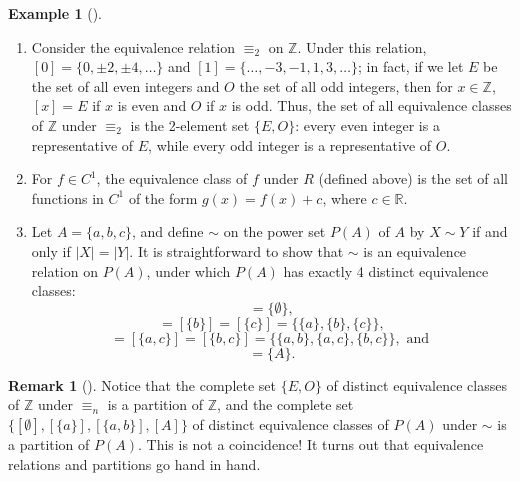 \documentclass[10pt,]{book}
\theoremstyle{plain}
\theoremstyle{definition}
\theoremstyle{definition}
\newtheorem{remark}[theorem]{Remark}
\theoremstyle{definition}
\newtheorem{example}[theorem]{Example}
\theoremstyle{definition}
\numberwithin{equation}{section}
\def\Z{\mathbb{Z}}
\def\R{\mathbb{R}}
\begin{document}
\begin{example}[]\label{example-66}
\leavevmode%
\begin{enumerate}
\item\hypertarget{li-405}{}Consider the equivalence relation \(\equiv_2\) on \(\Z\).  Under this relation, \([0]=\{0,\pm 2, \pm 4, \ldots\}\) and \([1]=\{\ldots, -3, -1, 1, 3, \ldots\}\); in fact, if we let \(E\) be the set of all even integers and \(O\) the set of all odd integers, then for \(x\in \Z\), \([x]=E\) if \(x\) is even and \(O\) if \(x\) is odd. Thus, the set of all equivalence classes of \(\Z\) under \(\equiv_2\) is the 2-element set \(\{E,O\}\): every even integer is a representative of \(E\), while every odd integer is a representative of \(O\).%
\item\hypertarget{li-406}{}For \(f\in C^1\), the equivalence class of \(f\) under \(R\) (defined above) is the set of all functions in \(C^1\) of the form \(g(x)=f(x)+c\), where \(c\in \R\).%
\item\hypertarget{li-407}{}Let \(A=\{a,b,c\}\), and define \(\sim\) on the power set \(P(A)\) of \(A\) by \(X\sim Y\) if and only if \(|X|=|Y|\). It is straightforward to show that \(\sim\) is an equivalence relation on \(P(A)\), under which \(P(A)\) has exactly 4 distinct equivalence classes:%
\begin{equation*}
[\emptyset]=\{\emptyset\},
\end{equation*}
%
\begin{equation*}
[\{a\}]=[\{b\}]=[\{c\}]=\{\{a\},\{b\}, \{c\}\},
\end{equation*}
%
\begin{equation*}
[\{a,b\}]=[\{a,c\}]=[\{b,c\}]=\{\{a,b\},\{a,c\},\{b,c\}\}, \text{ and }
\end{equation*}
%
\begin{equation*}
[A]=\{A\}.
\end{equation*}
%
\end{enumerate}
\end{example}
\begin{remark}[]\label{remark-36}
Notice that the complete set \(\{E,O\}\) of distinct equivalence classes of \(\Z\) under \(\equiv_n\) is a partition of \(\Z\), and the complete set \(\{[\emptyset],[\{a\}],[\{a,b\}],[A]\}\) of distinct equivalence classes of \(P(A)\) under \(\sim\) is a partition of \(P(A)\). This is not a coincidence! It turns out that equivalence relations and partitions go hand in hand.%
\end{remark}
\end{document}
